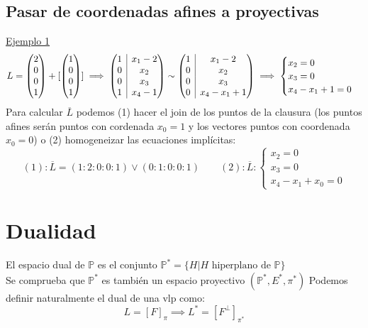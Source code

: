 \documentclass[leqno]{article}
\renewcommand{\P}{\mathbb{P}}
\begin{document}
\subsection{Pasar de coordenadas afines a proyectivas}
\underline{Ejemplo 1} \\
\[
  L = \begin{pmatrix} 2 \\ 0\\0\\1 \end{pmatrix} + [\begin{pmatrix} 1\\0\\0\\1 \end{pmatrix} ] \implies \left(\begin{array}{@{}c|c@{}} 1 & x_1-2 \\ 0 & x_2 \\ 0 & x_3 \\ 1 & x_4-1 \end{array}  \right) \sim \left(\begin{array}{@{}c|c@{}} 1 & x_1-2 \\ 0 & x_2 \\ 0 & x_3 \\ 0 & x_4-x_1+1 \end{array} \right) \implies
  \begin{cases}
    x_2 = 0 \\
	x_3 = 0 \\
	x_4-x_1+1 = 0
  \end{cases}
\] 
Para calcular $\overline{L}$ podemos (1) hacer el join de los puntos de la clausura (los puntos afines serán puntos con cordenada $x_0=1$ y los vectores puntos con coordenada $x_0=0$) o (2) homogeneizar las ecuaciones implícitas:
 \[
   (1): \overline{L} = (1:2:0:0:1)\vee (0:1:0:0:1) \qquad (2): \overline{L}:\begin{cases}
     x_2=0\\
	 x_3=0\\
	 x_4-x_1+x_0=0
   \end{cases}
\] 

\section{Dualidad}
El espacio dual de $\P$ es el conjunto $\P^* = \{H | H \text{ hiperplano de }\P\}$ \\
Se comprueba que $\P^*$ es también un espacio proyectivo $(\P^*, E^*, \pi^*)$
Podemos definir naturalmente el dual de una vlp como:
$$
L = [F]_\pi \implies L^* = [F^\perp]_{\pi^*}
$$
\end{document}
